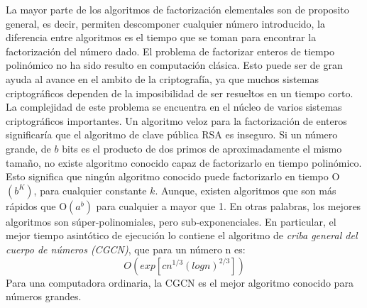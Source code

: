 La mayor parte de los algoritmos de factorización elementales son de proposito general, es decir, permiten descomponer cualquier
número introducido, la diferencia entre algoritmos es el tiempo que se toman para encontrar la factorización del número dado. El problema de 
factorizar enteros de tiempo polinómico no ha sido resulto en computación clásica. Esto puede ser de gran ayuda al avance en el ambito de la 
criptografía, ya que muchos sistemas criptográficos dependen de la imposibilidad de ser resueltos en un tiempo corto. La complejidad de este problema se encuentra en el núcleo de varios sistemas criptográficos importantes. Un algoritmo veloz para la factorización
de enteros significaría que el algoritmo de clave pública RSA es inseguro. Si un número grande, de $b$ bits es el producto de dos primos
de aproximadamente el mismo tamaño, no existe algoritmo conocido capaz de factorizarlo en tiempo polinómico. Esto significa que ningún algoritmo
conocido puede factorizarlo en tiempo O$(b^K)$, para cualquier constante $k$. Aunque, existen algoritmos que son más rápidos que O$(a^b)$ para cualquier a 
mayor que 1. En otras palabras, los mejores algoritmos son súper-polinomiales, pero sub-exponenciales. En particular, el mejor tiempo
asintótico de ejecución lo contiene el algoritmo de \textit{criba general del cuerpo de números\cite{Agrios2003} (CGCN)}, que para un número n es:
\begin{equation}
    O\left(exp\left[c n^{1/3} \left(log n\right)^{2/3} \right] \right)
    \label{eq:O(clasico)}
\end{equation}
Para una computadora ordinaria, la CGCN es el mejor algoritmo conocido para números grandes.\\

